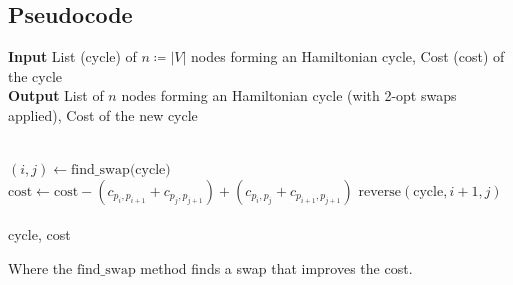 \subsection{Pseudocode}
\begin{algorithm}
    \caption{2-opt algorithm for the TSP}
    \hspace*{\algorithmicindent}\hspace*{\algorithmicindent} \textbf{Input} List (cycle) of $n\coloneq|V|$ nodes forming an Hamiltonian cycle, Cost (cost) of the cycle\\
    \hspace*{\algorithmicindent} \textbf{Output} List of $n$ nodes forming an Hamiltonian cycle (with 2-opt swaps applied), Cost of the new cycle
    \begin{algorithmic}\\

            \State $(i, j)\gets \mbox{find\_swap(cycle)}$
            \State $\mbox{cost}\gets\mbox{cost}-(c_{p_i,p_{i+1}}+c_{p_j,p_{j+1}})+(c_{p_i,p_{j}}+c_{p_{i+1},p_{j+1}})$
            \State $\mbox{reverse}(\mbox{cycle}, i+1, j)$
        \EndWhile\\\\

        \Return cycle, cost

    \end{algorithmic}
\end{algorithm}
Where the $\mbox{find\_swap}$ method finds a swap that improves the cost.

\newpage

